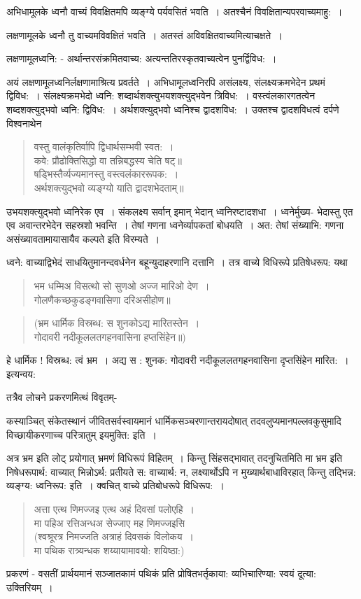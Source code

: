 {अभिधामूलके ध्वनौ वाच्यं विवक्षितमपि व्यङ्ग्ये पर्यवसितं भवति~। अतश्चैनं विवक्षितान्यपरवाच्यमाहु:~। 

लक्षणामूलके ध्वनौ तु वाच्यमविवक्षितं भवति~। अतस्तं अविवक्षितवाच्यमित्याचक्षते~। 

लक्षणामूलध्वनि: - अर्थान्तरसंक्रमितवाच्य: अत्यन्ततिरस्कृतवाच्यत्वेन पुनर्द्विविध:~। 

अयं लक्षणामूलध्वनिर्लक्षणामाश्रित्य प्रवर्तते~। अभिधामूलध्वनिरपि असंलक्ष्य,  संलक्ष्यक्रमभेदेन प्रथमं द्विविध:~।  संलक्ष्यक्रमभेदो ध्वनि: शब्दार्थशक्त्युभयशक्त्युद्भवेन त्रिविध:~। वस्त्वंलकारगतत्वेन शब्दशक्त्युद्भवो ध्वनि: द्विविध:~। अर्थशक्त्युद्भवो ध्वनिश्च द्वादशविध:~। उक्तश्च द्वादशविधत्वं दर्पणे विश्वनाथेन

\begin{verse}
वस्तु वालंकृतिर्वापि द्विधार्थसम्भवी स्वत:~। \\
कवे: प्रौढोक्तिसिद्धो वा तन्निबद्धस्य चेति षट्॥\\
षड्भिस्तैर्व्यज्यमानस्तु वस्त्वलंकाररूपक:~। \\
अर्थशक्त्युद्भवो व्यङ्ग्यो याति द्वादशभेदताम्॥
\end{verse}
उभयशक्त्युद्भवो ध्वनिरेक एव~। संकलक्ष्य सर्वान् इमान् भेदान् ध्वनिरष्टादशधा~। ध्वनेर्मुख्य- भेदास्तु एत एव अवान्तरभेदेन सहस्रशो भवन्ति~। तेषां गणना ध्वनेर्व्यापकतां बोधयति~। अत: तेषां संख्याभि: गणना असंख्यावतामायासायैव कल्पते इति विरम्यते~। 

ध्वने: वाच्याद्विभेदं साधयितुमानन्दवर्धनेन बहून्युदाहरणानि दत्तानि~। तत्र वाच्ये विधिरूपे प्रतिषेधरूप: यथा 
\begin{verse}
भम धम्मिअ विसत्थो सो सुणओ अज्ज मारिओ देण~। \\
गोलणैकच्छकुडङ्गवासिणा दरिअसीहोण॥
\end{verse}
\begin{verse}
(भ्रम धार्मिक विस्रब्ध: स शुनकोऽद्य मारितस्तेन~। \\
गोदावरी नदीकूललतगहनवासिना हप्तसिंहेन॥)
\end{verse}
हे धार्मिक !  विस्रब्ध: त्वं भ्रम~। अद्य स : शुनक: गोदावरी नदीकूललतगहनवासिना दृप्तसिंहेन मारित:~। इत्यन्वय:

तत्रैव लोचने प्रकरणमित्थं विवृतम्-

कस्याञ्चित् संकेतस्थानं जीवितसर्वस्वायमानं धार्मिकसञ्चरणान्तरायदोषात् तदवलुप्यमानपल्लवकुसुमादि विच्छायीकरणाच्च परित्रातुम् इयमुक्ति: इति~। 

अत्र भ्रम इति लोट् प्रयोगात् भ्रमणं विधिरूपं विहितम्~। किन्तु सिंहसद्भावात् तदनुचितमिति मा भ्रम इति निषेधरूपार्थ: वाच्यात् भिन्नोऽर्थ: प्रतीयते स: वाच्यार्थ: न, लक्ष्यार्थोऽपि न मुख्यार्थबाधाविरहात् किन्तु तद्भिन्न: व्यङ्ग्य: ध्वनिरूप: इति~। क्वचित् वाच्ये प्रतिबोधरूपे विधिरूप:~। 
\begin{verse}
अत्ता एत्थ णिमज्जइ एत्थ अहं दिवसां पलोएहि~। \\
मा पहिअ रत्तिअन्धअ सेज्जाए मह णिमज्जइसि\\
(श्वश्रूरत्र निमज्जति अत्राहं दिवसकं विलोकय~। \\
मा पथिक रात्र्यन्धक शय्यायामावयो: शयिष्ठा:)
\end{verse}
प्रकरणं - वसतीं प्रार्थयमानं सञ्जातकामं पथिकं प्रति प्रोषितभर्तृकाया: व्यभिचारिण्या: स्वयं दूत्या: उक्तिरियम्~। 

}
